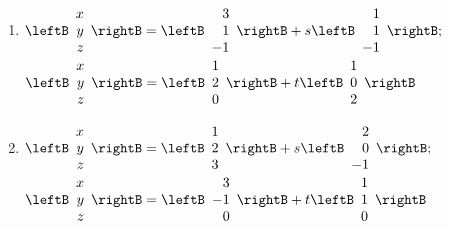 \begin{multicols}{2}
\begin{ex}
\begin{enumerate}[label={\alph*.}]
\item 
$\leftB
\begin{array}{r}
x\\
y\\
z
\end{array}
\rightB
=
\leftB
\begin{array}{r}
3\\
1\\
-1
\end{array}
\rightB
+s
\leftB
\begin{array}{r}
1\\
1\\
-1
\end{array}
\rightB; $ \\ $
\leftB
\begin{array}{r}
x\\
y\\
z
\end{array}
\rightB
=
\leftB
\begin{array}{r}
1\\
2\\
0
\end{array}
\rightB
+t
\leftB
\begin{array}{r}
1\\
0\\
2
\end{array}
\rightB$

\item 
$\leftB
\begin{array}{r}
x\\
y\\
z
\end{array}
\rightB
=
\leftB
\begin{array}{r}
1\\
2\\
3
\end{array}
\rightB
+s
\leftB
\begin{array}{r}
2\\
0\\
-1
\end{array}
\rightB; $ \\ $
\leftB
\begin{array}{r}
x\\
y\\
z
\end{array}
\rightB
=
\leftB
\begin{array}{r}
3\\
-1\\
0
\end{array}
\rightB
+t
\leftB
\begin{array}{r}
1\\
1\\
0
\end{array}
\rightB$


\end{enumerate}
\end{ex}
\end{multicols}
